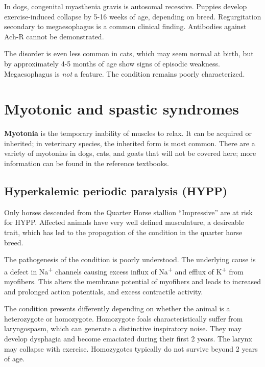 \documentclass[openany]{book}
\begin{document}
In dogs, congenital myasthenia gravis is autosomal recessive. Puppies
develop exercise-induced collapse by 5-16 weeks of age, depending on
breed. Regurgitation secondary to megaesophagus is a common clinical
finding. Antibodies against Ach-R cannot be demonstrated.

The disorder is even less common in cats, which may seem normal at
birth, but by approximately 4-5 months of age show signs of episodic
weakness. Megaesophagus is \emph{not} a feature. The condition remains
poorly characterized.

\section{Myotonic and spastic
syndromes}\label{myotonic-and-spastic-syndromes}

\textbf{Myotonia} is the temporary inability of muscles to relax. It can
be acquired or inherited; in veterinary species, the inherited form is
most common. There are a variety of myotonias in dogs, cats, and goats
that will not be covered here; more information can be found in the
reference textbooks.

\hypertarget{hyperkalemic-periodic-paralysis-hypp}{\subsection{Hyperkalemic
periodic paralysis (HYPP)}\label{hyperkalemic-periodic-paralysis-hypp}}

Only horses descended from the Quarter Horse stallion ``Impressive'' are
at risk for HYPP. Affected animals have very well defined musculature, a
desireable trait, which has led to the propogation of the condition in
the quarter horse breed.

The pathogenesis of the condition is poorly understood. The underlying
cause is a defect in Na\textsuperscript{+} channels causing excess
influx of Na\textsuperscript{+} and efflux of K\textsuperscript{+} from
myofibers. This alters the membrane potential of myofibers and leads to
increased and prolonged action potentials, and excess contractile
activity.

The condition presents differently depending on whether the animal is a
heterozygote or homozygote. Homozygote foals characteristically suffer
from laryngospasm, which can generate a distinctive inspiratory noise.
They may develop dysphagia and become emaciated during their first 2
years. The larynx may collapse with exercise. Homozygotes typically do
not survive beyond 2 years of age.
\end{document}
